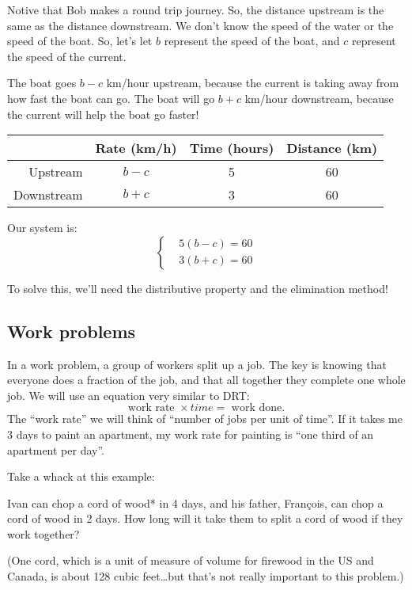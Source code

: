 Notive that Bob makes a round trip journey. So, the distance upstream is the same as the distance downstream. We don't know the speed of the water or the speed of the boat. So, let's let $b$ represent the speed of the boat, and $c$ represent the speed of the current.

The boat goes $b-c$ km/hour upstream, because the current is taking away from how fast the boat can go. The boat will go $b+c$ km/hour downstream, because the current will help the boat go faster!

\begin{center}
\begin{tabular}{r|ccc}
				& Rate (km/h)			& Time (hours)		& Distance (km)\\\hline
Upstream		& $b-c$				& 5					& 60\\
Downstream	& $b+c$				& 3					& 60\\
\end{tabular}
\end{center}

Our system is:
\[
\left\{%
\begin{aligned}
&5(b-c) = 60\\
&3(b+c) = 60
\end{aligned}
\right.
\]

To solve this, we'll need the distributive property and the elimination method!

\subsection*{Work problems}

In a work problem, a group of workers split up a job. The key is knowing that everyone does a fraction of the job, and that all together they complete one whole job. We will use an equation very similar to DRT:\[\text{work rate } \times { time } = \text{ work done}.\]
The ``work rate'' we will think of ``number of jobs per unit of time''. If it takes me 3 days to paint an apartment, my work rate for painting is ``one third of an apartment per day''.

Take a whack at this example:

\begin{boxex}[Work]
Ivan can chop a cord of wood* in 4 days, and his father, Fran\c{c}ois, can chop a cord of wood in 2 days. How long will it take them to split a cord of wood if they work together?

(One cord, which is a unit of measure of volume for firewood in the US and Canada, is about 128 cubic feet\ldots but that's not really important to this problem.)
\end{boxex}

